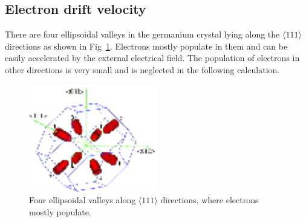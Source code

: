\subsection{Electron drift velocity}
\label{sec:pss:elec}
There are four ellipsoidal valleys in the germanium crystal lying along the $\langle111\rangle$ directions as shown in Fig~\ref{fig:pss:valley}. Electrons mostly populate in them and can be easily accelerated by the external electrical field. The population of electrons in other directions is very small and is neglected in the following calculation.
\begin{figure}[htpb]
  \centering
  \includegraphics[width=0.5\textwidth]{valleys}  
  \caption{Four ellipsoidal valleys along $\langle111\rangle$     directions, where electrons mostly populate.}
  \label{fig:pss:valley}
\end{figure}

